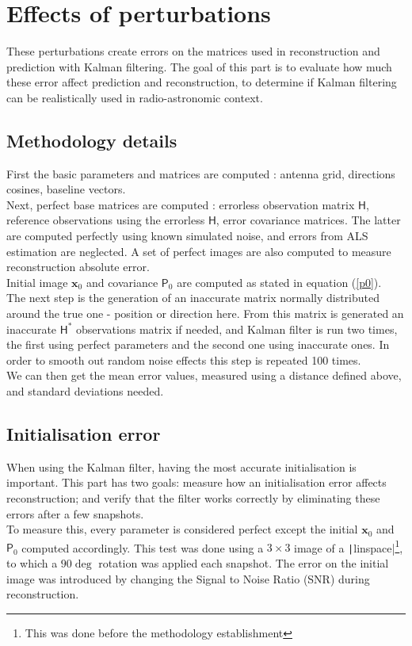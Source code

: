 \documentclass[titlepage,11pt]{article}
\renewcommand{\H}{\boldsymbol{\mathsf{H}}}
\newcommand{\x}{\boldsymbol{x}}
\renewcommand{\P}{\boldsymbol{\mathsf{P}}}
\begin{document}
	\section{Effects of perturbations}
	
	These perturbations create errors on the matrices used in reconstruction and prediction with Kalman filtering. The goal of this part is to evaluate how much these error affect prediction and reconstruction, to determine if Kalman filtering can be realistically used in radio-astronomic context. \\
	
	\subsection{Methodology details}

	First the basic parameters and matrices are computed : antenna grid, directions cosines, baseline vectors.\\ Next, perfect base matrices are computed : errorless observation matrix $\H$, reference observations using the errorless $\H$, error covariance matrices. The latter are computed perfectly using known simulated noise, and errors from ALS estimation are neglected. A set of perfect images are also computed to measure reconstruction absolute error.\\
	Initial image $\x_0$ and covariance $\P_0$ are computed as stated in equation (\ref{p0}).\\
	
	The next step is the generation of an inaccurate matrix normally distributed around the true one - position or direction here. From this matrix is generated an inaccurate  $\H^*$ observations matrix if needed, and Kalman filter is run two times, the first using perfect parameters and the second one using inaccurate ones. In order to smooth out random noise effects this step is repeated 100 times. \\
	
	We can then get the mean error values, measured using a distance defined above, and standard deviations needed.
	
	\subsection{Initialisation error}
	
	When using the Kalman filter, having the most accurate initialisation is important. This part has two goals: measure how an initialisation error affects reconstruction; and verify that the filter works correctly by eliminating these errors after a few snapshots. \\
	To measure this, every parameter is considered perfect except the initial $\x_0$ and $\P_0$ computed accordingly. This test was done using a $3\times 3$ image of a \texttt|linspace|\footnote{This was done before the methodology establishment}, to which a $90\deg$ rotation was applied each snapshot. The error on the initial image was introduced by changing the Signal to Noise Ratio (SNR) during reconstruction. \\
	
\end{document}
